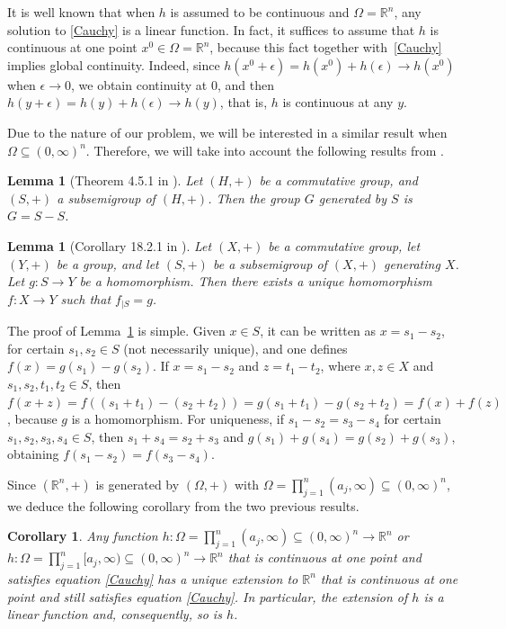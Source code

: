 \documentclass[12pt,reqno]{amsart}
\theoremstyle{plain}
\newtheorem{lemma}[theorem]{Lemma} %
\newtheorem{corollary}[theorem]{Corollary}
\numberwithin{equation}{section} %
\begin{document}
It is well known that when $h$ is assumed to be continuous and $\Omega = \mathbb{R}^n$, any solution to \eqref{Cauchy} is a linear function. In fact, it suffices to assume that $h$ is continuous at one point $x^0\in \Omega=\mathbb{R}^n$, because this fact together with~\eqref{Cauchy} implies global continuity. Indeed, since $h(x^0+\epsilon)=h(x^0)+h(\epsilon)\rightarrow h(x^0)$ when $\epsilon\rightarrow 0$, we obtain continuity at $0$, and then $h(y+\epsilon)=h(y)+h(\epsilon)\rightarrow h(y)$, that is, $h$ is continuous at any $y$.

Due to the nature of our problem, we will be interested in a similar result when $\Omega\subseteq (0,\infty)^n$. Therefore, we will take into account the following results from \cite{Kuczma}.

\begin{lemma}[Theorem 4.5.1 in \cite{Kuczma}]
Let $(H, +)$ be a commutative group, and $(S, +)$ a subsemigroup of $(H, +)$. Then the group $G$ generated by $S$ is $G = S - S$.
\end{lemma}

\begin{lemma}[Corollary 18.2.1 in \cite{Kuczma}] \label{lem_Ku} Let $(X, +)$ be a commutative group, let $(Y, +)$ be a group, and let $(S, +)$ be a subsemigroup of $(X, +)$ generating $X$. Let $g : S \to Y$ be a homomorphism. Then there exists a unique homomorphism $f : X \to Y$ such that $f_{|S} = g$.
\end{lemma}

The proof of Lemma~\ref{lem_Ku} is simple. Given $x\in S$, it can be written as $x=s_1-s_2$, for certain $s_1,s_2\in S$ (not necessarily unique), and one defines $f(x)=g(s_1)-g(s_2)$. If $x=s_1-s_2$ and $z=t_1-t_2$, where $x,z\in X$ and $s_1,s_2,t_1,t_2\in S$, then $f(x+z)=f((s_1+t_1)-(s_2+t_2))=g(s_1+t_1)-g(s_2+t_2)=f(x)+f(z)$, because $g$ is a homomorphism. For uniqueness, if $s_1-s_2=s_3-s_4$ for certain $s_1,s_2,s_3,s_4\in S$, then $s_1+s_4=s_2+s_3$ and $g(s_1)+g(s_4)=g(s_2)+g(s_3)$, obtaining $f(s_1-s_2)=f(s_3-s_4)$.

Since $(\mathbb{R}^n,+)$ is generated by $(\Omega,+)$ with $\Omega=\prod_{j=1}^n (a_j,\infty)\subseteq (0,\infty)^n$, we deduce the following corollary from the two previous results.

\begin{corollary} \label{linear} Any function $h: \Omega=\prod_{j=1}^n (a_j,\infty) \subseteq (0,\infty)^n \to \mathbb{R}^n$ or $h: \Omega=\prod_{j=1}^n [a_j,\infty) \subseteq (0,\infty)^n \to \mathbb{R}^n$ that is continuous at one point and satisfies equation \eqref{Cauchy} has a unique extension to $\mathbb{R}^n$ that is continuous at one point and still satisfies equation \eqref{Cauchy}. In particular, the extension of $h$ is a linear function and, consequently, so is $h$.
\end{corollary}
\end{document}

